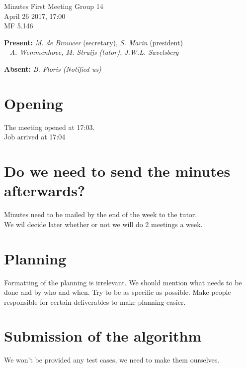 \documentclass[a4paper,twoside,11pt]{article}
\title{}
\date{}
\begin{document}

\begin{center}
\Huge{Minutes First Meeting Group 14}
\\\vspace*{2mm}
\Large{April 26 2017, 17:00}
\\\vspace*{2mm}
\large{MF 5.146}
\\
		\end{center}

		\textbf{Present:} \textit{M. de Brouwer} (secretary), \textit{S. Marin} (president)
\\\indent\qquad\,\,\,\,\,\qquad\quad \textit {A. Wemmenhove, M. Struijs (tutor), J.W.L. Savelsberg}

		\textbf{Absent:} \textit{B. Floris (Notified us)}
		
	\section{Opening}
	
	The meeting opened at 17:03. \\
	Job arrived at 17:04

	\section{Do we need to send the minutes afterwards?}
	
	Minutes need to be mailed by the end of the week to the tutor. \\
	We wil decide later whether or not we will do 2 meetings a week. 
	
	\section{Planning}
	
	Formatting of the planning is irrelevant. We should mention what needs to be done and by who and when. Try to be as specific as possible. Make people responsible for certain deliverables to make planning easier. 
	
	\section{Submission of the algorithm}
	
	We won't be provided any test cases, we need to make them ourselves. 
	
\end{document}
